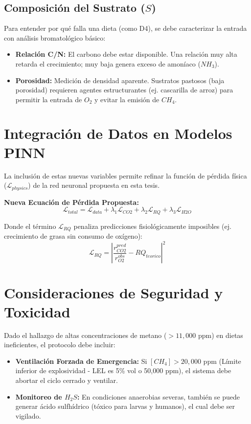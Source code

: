 \subsection{Composición del Sustrato ($S$)}
Para entender por qué falla una dieta (como D4), se debe caracterizar la entrada con análisis bromatológico básico:
\begin{itemize}
    \item \textbf{Relación C/N:} El carbono debe estar disponible. Una relación muy alta retarda el crecimiento; muy baja genera exceso de amoníaco ($NH_3$).
    \item \textbf{Porosidad:} Medición de densidad aparente. Sustratos pastosos (baja porosidad) requieren agentes estructurantes (ej. cascarilla de arroz) para permitir la entrada de $O_2$ y evitar la emisión de $CH_4$.
\end{itemize}

\section{Integración de Datos en Modelos PINN}

La inclusión de estas nuevas variables permite refinar la función de pérdida física ($\mathcal{L}_{physics}$) de la red neuronal propuesta en esta tesis.

\textbf{Nueva Ecuación de Pérdida Propuesta:}
\begin{equation}
    \mathcal{L}_{total} = \mathcal{L}_{data} + \lambda_1 \mathcal{L}_{CO2} + \lambda_2 \mathcal{L}_{RQ} + \lambda_3 \mathcal{L}_{H2O}
\end{equation}

Donde el término $\mathcal{L}_{RQ}$ penaliza predicciones fisiológicamente imposibles (ej. crecimiento de grasa sin consumo de oxígeno):
\begin{equation}
    \mathcal{L}_{RQ} = \left| \frac{r_{CO2}^{pred}}{r_{O2}^{obs}} - RQ_{teorico} \right|^2
\end{equation}

\section{Consideraciones de Seguridad y Toxicidad}
Dado el hallazgo de altas concentraciones de metano ($>11,000$ ppm) en dietas ineficientes, el protocolo debe incluir:
\begin{itemize}
    \item \textbf{Ventilación Forzada de Emergencia:} Si $[CH_4] > 20,000$ ppm (Límite inferior de explosividad - LEL es 5\% vol o 50,000 ppm), el sistema debe abortar el ciclo cerrado y ventilar.
    \item \textbf{Monitoreo de $H_2S$:} En condiciones anaerobias severas, también se puede generar ácido sulfhídrico (tóxico para larvas y humanos), el cual debe ser vigilado.
\end{itemize}

